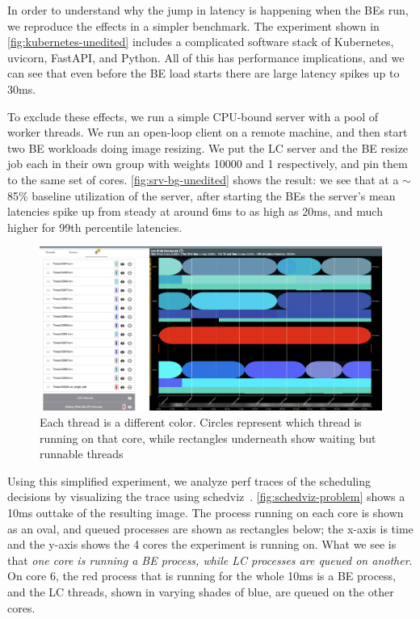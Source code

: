 In order to understand why the jump in latency is happening when the BEs run, we
reproduce the effects in a simpler benchmark. The experiment shown in
\autoref{fig:kubernetes-unedited} includes a complicated software stack of
Kubernetes, uvicorn, FastAPI, and Python. All of this has performance
implications, and we can see that even before the BE load starts there are large
latency spikes up to 30ms.

To exclude these effects, we run a simple CPU-bound server with a pool of worker
threads. We run an open-loop client on a remote machine, and then start two BE
workloads doing image resizing. We put the LC server and the BE resize job each
in their own \cgroups{} group with weights 10000 and 1 respectively, and pin
them to the same set of cores. \autoref{fig:srv-bg-unedited} shows the result: we see that at a
$\sim$85\% baseline utilization of the server, after starting the BEs the
server's mean latencies spike up from steady at around 6ms to as high as 20ms,
and much higher for 99th percentile latencies.

\begin{figure}[t]
    \centering
    \includegraphics[width=\columnwidth]{graphs/schedviz-problem.png}
    \caption{Each thread is a different color. Circles represent which
    thread is running on that core, while rectangles underneath show waiting but
    runnable threads
    }\label{fig:schedviz-problem}
\end{figure}

Using this simplified experiment, we analyze perf traces of the scheduling
decisions by visualizing the trace using schedviz~\cite{schedviz-tool}.
\autoref{fig:schedviz-problem} shows a 10ms outtake of the resulting image. The
process running on each core is shown as an oval, and queued processes are shown
as rectangles below; the x-axis is time and the y-axis shows the 4 cores the
experiment is running on. What we see is that \textit{one core is running a BE
process, while LC processes are queued on another}. On core 6, the red process
that is running for the whole 10ms is a BE process, and the LC threads, shown in
varying shades of blue, are queued on the other cores.

